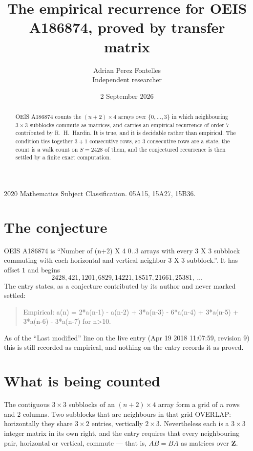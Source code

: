 \documentclass[11pt,a4paper]{article}
\title{The empirical recurrence for OEIS A186874, proved by transfer matrix}
\author{Adrian Perez Fontelles\\ \small Independent researcher}
\date{2 September 2026}
\theoremstyle{plain}
\theoremstyle{definition}
\begin{document}
\maketitle

\begin{abstract}
OEIS A186874 counts the $(n+2)\times4$ arrays over $\{0,\dots,3\}$ in which
neighbouring $3\times3$ subblocks commute as matrices, and carries an empirical
recurrence
of order $7$ contributed by R.~H.~Hardin. It is true, and it is decidable rather than
empirical. The condition ties together $3+1$ consecutive rows, so $3$ consecutive rows are
a state, the count is a walk count on $S=2428$ of them, and the conjectured recurrence is then
settled by a finite exact computation.
\end{abstract}

\noindent\small 2020 Mathematics Subject Classification. 05A15, 15A27, 15B36.\normalsize

\section{The conjecture}

OEIS A186874 is ``Number of (n+2) X 4 0..3 arrays with every 3 X 3 subblock commuting with each horizontal and vertical neighbor 3 X 3 subblock.''. It has offset $1$ and begins
\[
2428, 421, 1201, 6829, 14221, 18517, 21661, 25381,\ \dots
\]
The entry states, as a conjecture contributed by its author and never marked settled:
\begin{quote}
Empirical: a(n) = 2*a(n-1) - a(n-2) + 3*a(n-3) - 6*a(n-4) + 3*a(n-5) + 3*a(n-6) - 3*a(n-7) for n>10.
\end{quote}
As of the ``Last modified'' line on the live entry (Apr 19 2018 11:07:59, revision 9) this is still
recorded as empirical, and nothing on the entry records it as proved.

\section{What is being counted}

The contiguous $3\times3$ subblocks of an $(n+2)\times4$ array form a grid of $n$
rows and $2$ columns. Two subblocks that are neighbours in that
grid OVERLAP: horizontally they share $3\times2$ entries, vertically
$2\times3$. Nevertheless each is a $3\times3$ integer matrix in its own right, and
the entry requires that every neighbouring pair, horizontal or vertical, commute --- that is,
$AB=BA$ as matrices over $\mathbf{Z}$.
\end{document}
